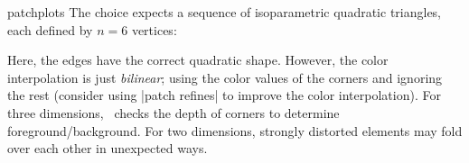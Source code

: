 {\begin{pgfplotslibrary}{patchplots}
	The choice  expects a sequence of isoparametric quadratic triangles, each defined by $n=6$ vertices:
\begin{codeexample}[]
\end{codeexample}
\begin{codeexample}[]
\end{codeexample}
	\noindent Here, the edges have the correct quadratic shape. However, the color interpolation is just \emph{bilinear}; using the color values of the corners and ignoring the rest (consider using |patch refines| to improve the color interpolation). For three dimensions, \PGFPlots\ checks the depth of corners to determine foreground/background. For two dimensions, strongly distorted elements may fold over each other in unexpected ways. 


\end{pgfplotslibrary}}

